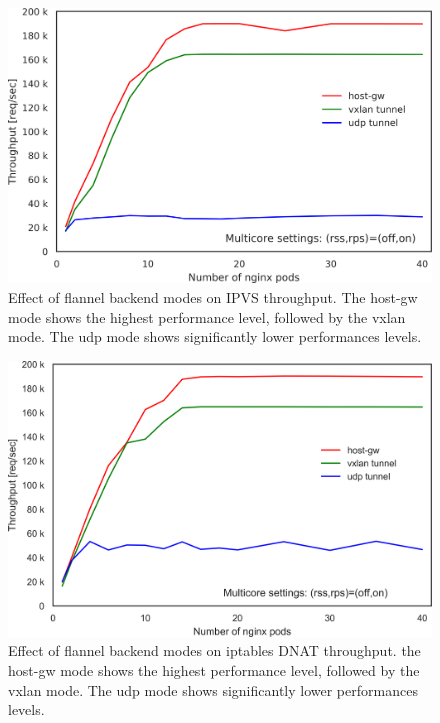 \begin{figure}[h]
  \centering
  \includegraphics[width=0.75\columnwidth]{Figs/ipvs_flannel_mode}

  \par\bigskip
  \centering
  \begin{minipage}{0.9\columnwidth}
    \caption[Effect of flannel backend modes on IPVS throughput]{
      Effect of flannel backend modes on IPVS throughput.
      The host-gw mode shows the highest performance level, followed by the vxlan mode.
      The udp mode shows significantly lower performances levels.
    }
    \label{fig:ipvs_flannel_mode}
  \end{minipage}
\end{figure}

\begin{figure}[h]
    \centering
    \includegraphics[width=0.75\columnwidth]{Figs/iptables_flannel_mode}

  \par\bigskip
  \centering
  \begin{minipage}{0.9\columnwidth}
    \caption[Effect of flannel backend modes on iptables DNAT throughput]{
      Effect of flannel backend modes on iptables DNAT throughput.
      the host-gw mode shows the highest performance level, followed by the vxlan mode.
      The udp mode shows significantly lower performances levels.
    }
    \label{fig:iptables_flannel_mode}
  \end{minipage}
\end{figure}

